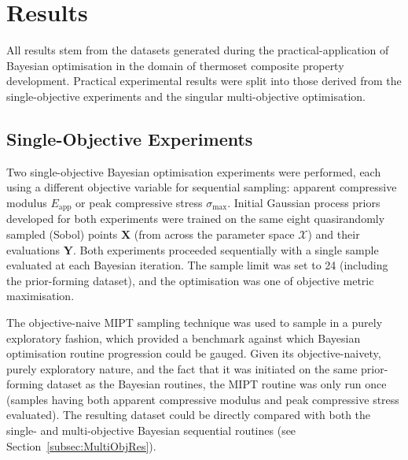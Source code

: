 \section{Results}
All results stem from the datasets generated during the practical-application
 of Bayesian optimisation in the domain of thermoset composite property
 development.
Practical experimental results were split into those derived from the
 single-objective experiments and the singular multi-objective optimisation.

\subsection{Single-Objective Experiments}
\label{subsec:UniObjRes}
Two single-objective Bayesian optimisation experiments were performed, each
 using a different objective variable for sequential sampling: apparent compressive
 modulus \(E_{\text{app}}\) or peak compressive stress \(\sigma_{\text{max}}\).
Initial Gaussian process priors developed for both experiments were trained
 on the same eight quasirandomly sampled (Sobol) points \(\mathbf{X}\) (from
 across the parameter space \(\mathcal{X}\)) and their evaluations
 \(\mathbf{Y}\).
Both experiments proceeded sequentially with a single sample evaluated at 
 each Bayesian iteration.
The sample limit was set to 24 (including the
 prior-forming dataset), and the optimisation was one of objective metric
 maximisation.

The objective-naive MIPT sampling technique was used to sample in a purely 
 exploratory fashion, which provided a benchmark against which Bayesian 
 optimisation routine progression could be gauged.
Given its objective-naivety, purely exploratory nature, and the fact that
 it was initiated on the same prior-forming dataset as the Bayesian routines,
 the MIPT routine was only run once (samples having both apparent compressive
 modulus and peak compressive stress evaluated).
The resulting dataset could be directly compared with both the single- 
 and multi-objective Bayesian sequential routines (see Section~\ref{subsec:MultiObjRes}).

